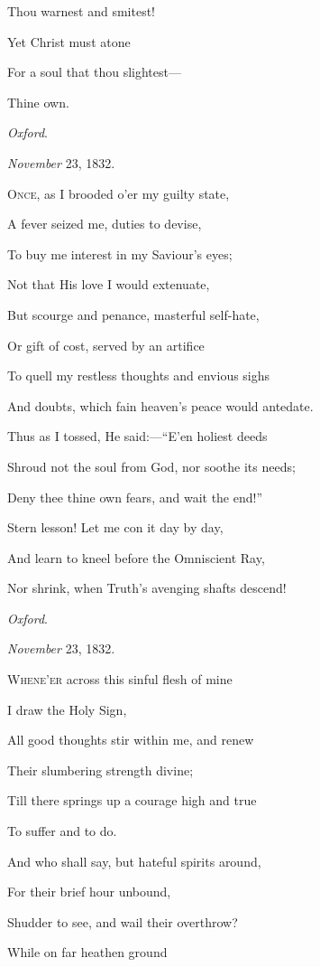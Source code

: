 Thou warnest and smitest!

Yet Christ must atone

For a soul that thou slightest—

Thine own.

\emph{Oxford}.

\emph{November} 23, 1832.


O\textsc{nce}, as I brooded o'er my guilty state,

A fever seized me, duties to devise,

To buy me interest in my Saviour's eyes;

Not that His love I would extenuate,

But scourge and penance, masterful self-hate,

Or gift of cost, served by an artifice

To quell my restless thoughts and envious
sighs

And doubts, which fain heaven's peace would antedate.

Thus as I tossed, He said:—``E'en holiest deeds

Shroud not the soul from God, nor soothe its needs;

Deny thee thine own fears, and wait the end!''

Stern lesson! Let me con it day by day,

And learn to kneel before the Omniscient Ray,

Nor shrink, when Truth's avenging shafts descend!

\emph{Oxford}.

\emph{November} 23, 1832.


W\textsc{hene'er} across this sinful flesh of mine

I draw the Holy Sign,

All good thoughts stir within me, and renew

Their slumbering strength divine;

Till there springs up a courage high and true

To suffer and to do.

And who shall say, but hateful spirits around,

For their brief hour unbound,

Shudder to see, and wail their overthrow?

While on far heathen ground

